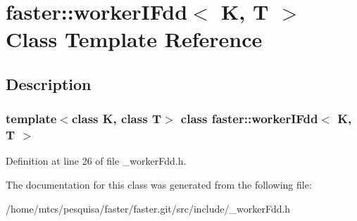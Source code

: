 \hypertarget{classfaster_1_1workerIFdd}{}\section{faster\+:\+:worker\+I\+Fdd$<$ K, T $>$ Class Template Reference}
\label{classfaster_1_1workerIFdd}


\subsection{Description}
\subsubsection*{template$<$class K, class T$>$\newline
class faster\+::worker\+I\+Fdd$<$ K, T $>$}



Definition at line 26 of file \+\_\+worker\+Fdd.\+h.



The documentation for this class was generated from the following file\+:\begin{DoxyCompactItemize}
\item 
/home/mtcs/pesquisa/faster/faster.\+git/src/include/\+\_\+worker\+Fdd.\+h\end{DoxyCompactItemize}
